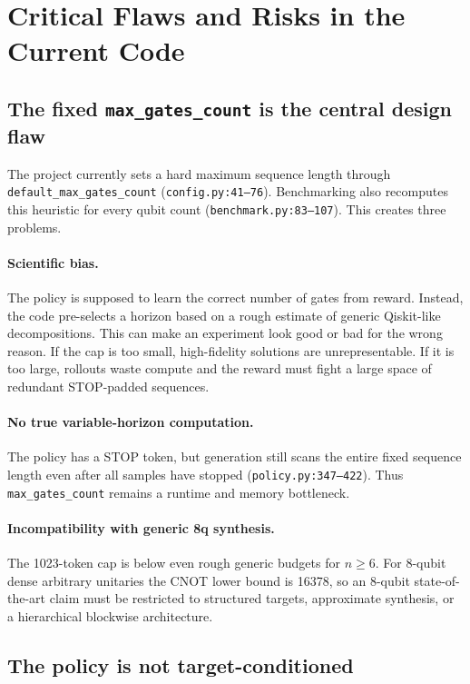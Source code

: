 \documentclass[11pt,a4paper]{article}
\begin{document}
\section{Critical Flaws and Risks in the Current Code}

\subsection{The fixed \texttt{max\_gates\_count} is the central design flaw}

The project currently sets a hard maximum sequence length through
\texttt{default\_max\_gates\_count} (\texttt{config.py:41--76}). Benchmarking
also recomputes this heuristic for every qubit count
(\texttt{benchmark.py:83--107}). This creates three problems.

\paragraph{Scientific bias.}
The policy is supposed to learn the correct number of gates from reward.
Instead, the code pre-selects a horizon based on a rough estimate of generic
Qiskit-like decompositions. This can make an experiment look good or bad for
the wrong reason. If the cap is too small, high-fidelity solutions are
unrepresentable. If it is too large, rollouts waste compute and the reward
must fight a large space of redundant STOP-padded sequences.

\paragraph{No true variable-horizon computation.}
The policy has a STOP token, but generation still scans the entire fixed
sequence length even after all samples have stopped (\texttt{policy.py:347--422}).
Thus \texttt{max\_gates\_count} remains a runtime and memory bottleneck.

\paragraph{Incompatibility with generic 8q synthesis.}
The 1023-token cap is below even rough generic budgets for $n\ge 6$. For
8-qubit dense arbitrary unitaries the CNOT lower bound is 16378, so an
8-qubit state-of-the-art claim must be restricted to structured targets,
approximate synthesis, or a hierarchical blockwise architecture.

\subsection{The policy is not target-conditioned}
\end{document}
